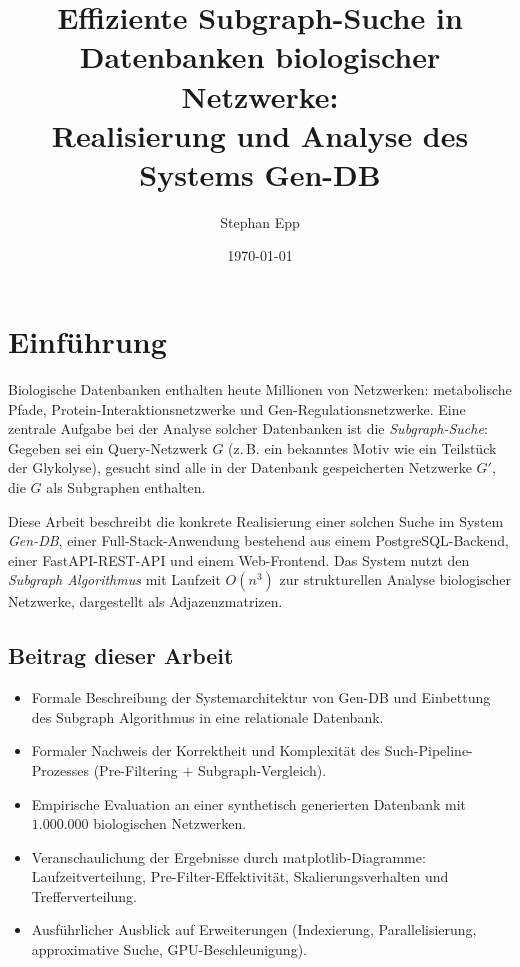 \documentclass[a4paper,12pt]{article}
\title{Effiziente Subgraph-Suche in Datenbanken biologischer Netzwerke:\\
Realisierung und Analyse des Systems Gen-DB}
\author{Stephan Epp}
\date{\today}
\theoremstyle{definition}
\begin{document}
\maketitle

\tableofcontents
\newpage

\section{Einführung}

Biologische Datenbanken enthalten heute Millionen von Netzwerken: metabolische Pfade, Protein-Interaktionsnetzwerke und Gen-Regulationsnetzwerke. Eine zentrale Aufgabe bei der Analyse solcher Datenbanken ist die \emph{Subgraph-Suche}: Gegeben sei ein Query-Netzwerk $G$ (z.\,B. ein bekanntes Motiv wie ein Teilstück der Glykolyse), gesucht sind alle in der Datenbank gespeicherten Netzwerke $G'$, die $G$ als Subgraphen enthalten.

Diese Arbeit beschreibt die konkrete Realisierung einer solchen Suche im System \emph{Gen-DB}, einer Full-Stack-Anwendung bestehend aus einem PostgreSQL-Backend, einer FastAPI-REST-API und einem Web-Frontend. Das System nutzt den \emph{Subgraph Algorithmus} \cite{epp2026subgraph} mit Laufzeit $O(n^3)$ zur strukturellen Analyse biologischer Netzwerke, dargestellt als Adjazenzmatrizen.

\subsection{Beitrag dieser Arbeit}

\begin{itemize}
	\item Formale Beschreibung der Systemarchitektur von Gen-DB und Einbettung des Subgraph Algorithmus in eine relationale Datenbank.
	\item Formaler Nachweis der Korrektheit und Komplexität des Such-Pipeline-Prozesses (Pre-Filtering $+$ Subgraph-Vergleich).
	\item Empirische Evaluation an einer synthetisch generierten Datenbank mit $1.000.000$ biologischen Netzwerken.
	\item Veranschaulichung der Ergebnisse durch matplotlib-Diagramme: Laufzeitverteilung, Pre-Filter-Effektivität, Skalierungsverhalten und Trefferverteilung.
	\item Ausführlicher Ausblick auf Erweiterungen (Indexierung, Parallelisierung, approximative Suche, GPU-Beschleunigung).
\end{itemize}
\end{document}

